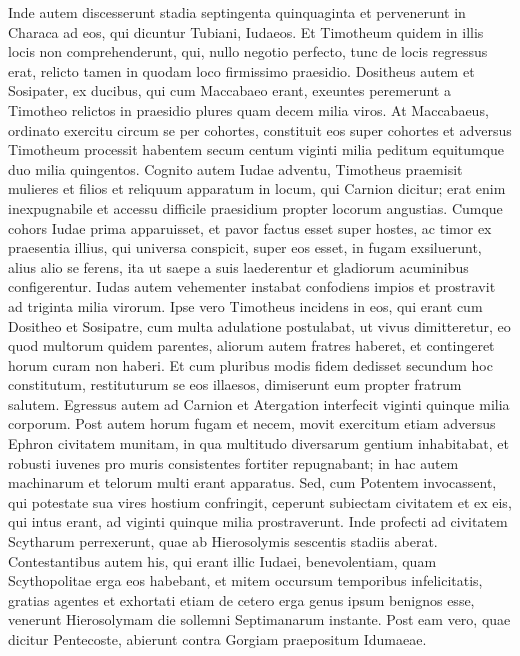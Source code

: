 \begin{biblechapter}
\verse Inde autem discesserunt stadia septingenta quinquaginta et pervenerunt in Characa ad eos, qui dicuntur Tubiani, Iudaeos. 
\verse Et Timotheum quidem in illis locis non comprehenderunt, qui, nullo negotio perfecto, tunc de locis regressus erat, relicto tamen in quodam loco firmissimo praesidio. 
\verse Dositheus autem et Sosipater, ex ducibus, qui cum Maccabaeo erant, exeuntes peremerunt a Timotheo relictos in praesidio plures quam decem milia viros.  
\verse At Maccabaeus, ordinato exercitu circum se per cohortes, constituit eos super cohortes et adversus Timotheum processit habentem secum centum viginti milia peditum equitumque duo milia quingentos. 
\verse Cognito autem Iudae adventu, Timotheus praemisit mulieres et filios et reliquum apparatum in locum, qui Carnion dicitur; erat enim inexpugnabile et accessu difficile praesidium propter locorum angustias. 
\verse Cumque cohors Iudae prima apparuisset, et pavor factus esset super hostes, ac timor ex praesentia illius, qui universa conspicit, super eos esset, in fugam exsiluerunt, alius alio se ferens, ita ut saepe a suis laederentur et gladiorum acuminibus configerentur. 
\verse Iudas autem vehementer instabat confodiens impios et prostravit ad triginta milia virorum. 
\verse Ipse vero Timotheus incidens in eos, qui erant cum Dositheo et Sosipatre, cum multa adulatione postulabat, ut vivus dimitteretur, eo quod multorum quidem parentes, aliorum autem fratres haberet, et contingeret horum curam non haberi. 
\verse Et cum pluribus modis fidem dedisset secundum hoc constitutum, restituturum se eos illaesos, dimiserunt eum propter fratrum salutem. 
\verse Egressus autem ad Carnion et Atergation interfecit viginti quinque milia corporum. 
\verse Post autem horum fugam et necem, movit exercitum etiam adversus Ephron civitatem munitam, in qua multitudo diversarum gentium inhabitabat, et robusti iuvenes pro muris consistentes fortiter repugnabant; in hac autem machinarum et telorum multi erant apparatus. 
\verse Sed, cum Potentem invocassent, qui potestate sua vires hostium confringit, ceperunt subiectam civitatem et ex eis, qui intus erant, ad viginti quinque milia prostraverunt.  
\verse Inde profecti ad civitatem Scytharum perrexerunt, quae ab Hierosolymis sescentis stadiis aberat. 
\verse Contestantibus autem his, qui erant illic Iudaei, benevolentiam, quam Scythopolitae erga eos habebant, et mitem occursum temporibus infelicitatis, 
\verse gratias agentes et exhortati etiam de cetero erga genus ipsum benignos esse, venerunt Hierosolymam die sollemni Septimanarum instante. 
\verse Post eam vero, quae dicitur Pentecoste, abierunt contra Gorgiam praepositum Idumaeae. 

\end{biblechapter}
